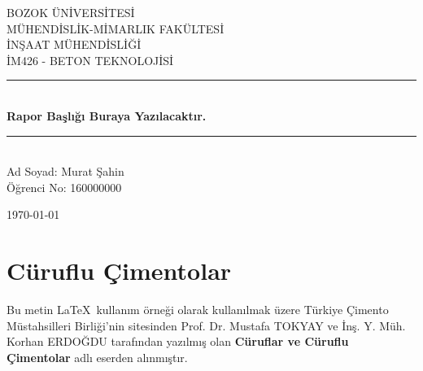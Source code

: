 \documentclass[12pt]{article}
\begin{document}
\begin{titlepage}
	\newcommand{\HRule}{\rule{\linewidth}{0.5mm}} 
	
	\center %
			
	\textsc{\LARGE BOZOK ÜNİVERSİTESİ}\\ 
	\textsc{\Large MÜHENDİSLİK-MİMARLIK FAKÜLTESİ}\\ 
	\textsc{\Large İNŞAAT MÜHENDİSLİĞİ}\\ 
	\textsc{\Large İM426 - BETON TEKNOLOJİSİ}\\[3.5cm] 
	
	
	\HRule\\[0.4cm]
	
	{\huge\bfseries Rapor Başlığı Buraya Yazılacaktır.}\\
	
	\HRule\\[4cm]
	
	{\Large Ad Soyad: Murat Şahin}\\
	{\Large Öğrenci No: 160000000}\\
	\vfill
	
	
	{\large\today} 
\end{titlepage}


\tableofcontents
\newpage
{} %

\section{Cüruflu Çimentolar} %
Bu metin \LaTeX \  kullanım örneği olarak kullanılmak üzere Türkiye Çimento Müstahsilleri Birliği'nin sitesinden Prof. Dr. Mustafa TOKYAY ve İnş. Y. Müh. Korhan ERDOĞDU tarafından yazılmış olan  \textbf{Cüruflar ve Cüruflu Çimentolar} adlı eserden alınmıştır.
\end{document}
